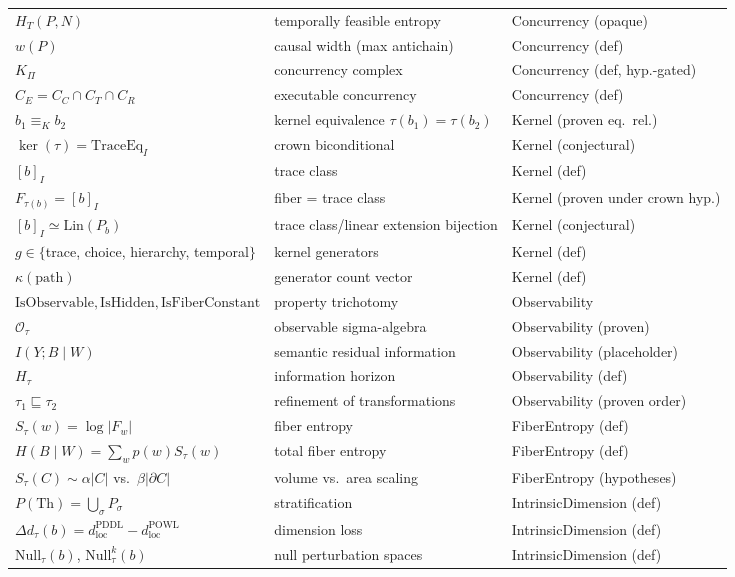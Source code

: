 \documentclass[11pt]{article}
\newcommand{\PT}{\Pi}                          %
\newcommand{\tmap}{\tau}                       %
\newcommand{\fib}[1]{F_{#1}}                   %
\newcommand{\kerEq}{\equiv_{K}}                %
\newcommand{\Lin}{\mathrm{Lin}}
\theoremstyle{plain}
\theoremstyle{definition}
\begin{document}
\begin{longtable}{@{}lll@{}}
$H_T(P, N)$ & temporally feasible entropy & Concurrency (opaque) \\
$w(P)$ & causal width (max antichain) & Concurrency (def) \\
$K_\PT$ & concurrency complex & Concurrency (def, hyp.-gated) \\
$C_E = C_C \cap C_T \cap C_R$ & executable concurrency & Concurrency (def) \\
$b_1 \kerEq b_2$ & kernel equivalence $\tmap(b_1) = \tmap(b_2)$ & Kernel (proven eq.\ rel.) \\
$\ker(\tmap) = \mathrm{TraceEq}_I$ & crown biconditional & Kernel (conjectural) \\
$[b]_I$ & trace class & Kernel (def) \\
$\fib{\tmap(b)} = [b]_I$ & fiber = trace class & Kernel (proven under crown hyp.) \\
$[b]_I \simeq \Lin(P_b)$ & trace class/linear extension bijection & Kernel (conjectural) \\
$g \in \{$trace, choice, hierarchy, temporal$\}$ & kernel generators & Kernel (def) \\
$\kappa(\mathrm{path})$ & generator count vector & Kernel (def) \\
$\mathrm{IsObservable}, \mathrm{IsHidden}, \mathrm{IsFiberConstant}$ & property trichotomy & Observability \\
$\mathcal{O}_\tmap$ & observable sigma-algebra & Observability (proven) \\
$I(Y; B \mid W)$ & semantic residual information & Observability (placeholder) \\
$H_\tmap$ & information horizon & Observability (def) \\
$\tmap_1 \sqsubseteq \tmap_2$ & refinement of transformations & Observability (proven order) \\
$S_\tmap(w) = \log|\fib{w}|$ & fiber entropy & FiberEntropy (def) \\
$H(B \mid W) = \sum_w p(w) S_\tmap(w)$ & total fiber entropy & FiberEntropy (def) \\
$S_\tmap(C) \sim \alpha|C|$ vs.\ $\beta|\partial C|$ & volume vs.\ area scaling & FiberEntropy (hypotheses) \\
$P(\mathrm{Th}) = \bigcup_\sigma P_\sigma$ & stratification & IntrinsicDimension (def) \\
$\Delta d_\tmap(b) = d^{\mathrm{PDDL}}_{\mathrm{loc}} - d^{\mathrm{POWL}}_{\mathrm{loc}}$ & dimension loss & IntrinsicDimension (def) \\
$\mathrm{Null}_\tmap(b)$, $\mathrm{Null}^k_\tmap(b)$ & null perturbation spaces & IntrinsicDimension (def) \\

\end{longtable}
\end{document}
